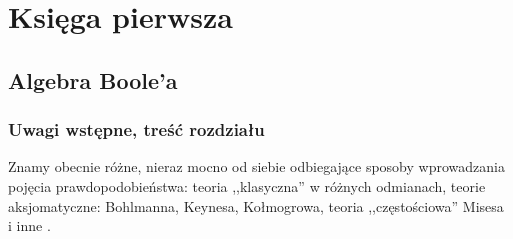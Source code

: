 \documentclass[12 pt, a4paper]{book}
\begin{document}
\part{Księga pierwsza}
\chapter{Algebra Boole'a}
\section{Uwagi wstępne, treść rozdziału}
Znamy obecnie różne, nieraz mocno od siebie odbiegające sposoby wprowadzania pojęcia 
prawdopodobieństwa: teoria ,,klasyczna'' w różnych odmianach, teorie aksjomatyczne:
 {\selectfont Bohlmanna, Keynesa, Kołmogrowa}, teoria ,,częstościowa''
{\selectfont Misesa} i inne \cite{bohlmann1}.
\end{document}

